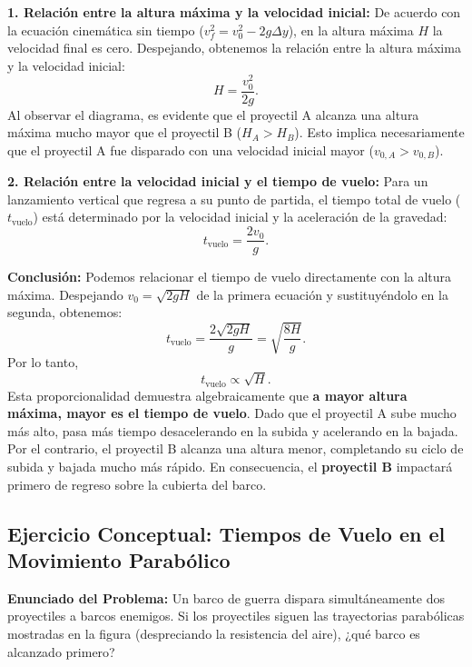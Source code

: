 \documentclass[11pt,a4paper]{book}
\begin{document}
\textbf{1. Relación entre la altura máxima y la velocidad inicial:}
De acuerdo con la ecuación cinemática sin tiempo ($v_f^2 = v_0^2 - 2g\Delta y$), en la altura máxima $H$ la velocidad final es cero. Despejando, obtenemos la relación entre la altura máxima y la velocidad inicial:
\begin{equation}
    H = \frac{v_{0}^2}{2g}.
\end{equation}
Al observar el diagrama, es evidente que el proyectil A alcanza una altura máxima mucho mayor que el proyectil B ($H_A > H_B$). Esto implica necesariamente que el proyectil A fue disparado con una velocidad inicial mayor ($v_{0, A} > v_{0, B}$).

\textbf{2. Relación entre la velocidad inicial y el tiempo de vuelo:}
Para un lanzamiento vertical que regresa a su punto de partida, el tiempo total de vuelo ($t_{\text{vuelo}}$) está determinado por la velocidad inicial y la aceleración de la gravedad:
\begin{equation}
    t_{\text{vuelo}} = \frac{2v_{0}}{g}.
\end{equation}

\textbf{Conclusión:}
Podemos relacionar el tiempo de vuelo directamente con la altura máxima. Despejando $v_0 = \sqrt{2gH}$ de la primera ecuación y sustituyéndolo en la segunda, obtenemos:
\begin{equation}
    t_{\text{vuelo}} = \frac{2\sqrt{2gH}}{g} = \sqrt{\frac{8H}{g}}.
\end{equation}
Por lo tanto,
\begin{equation}
    t_{\text{vuelo}} \propto \sqrt{H}.
\end{equation}
Esta proporcionalidad demuestra algebraicamente que \textbf{a mayor altura máxima, mayor es el tiempo de vuelo}. Dado que el proyectil A sube mucho más alto, pasa más tiempo desacelerando en la subida y acelerando en la bajada. Por el contrario, el proyectil B alcanza una altura menor, completando su ciclo de subida y bajada mucho más rápido. En consecuencia, el \textbf{proyectil B} impactará primero de regreso sobre la cubierta del barco.

\subsection*{Ejercicio Conceptual: Tiempos de Vuelo en el Movimiento Parabólico}

\textbf{Enunciado del Problema:} Un barco de guerra dispara simultáneamente dos proyectiles a barcos enemigos. Si los proyectiles siguen las trayectorias parabólicas mostradas en la figura (despreciando la resistencia del aire), ¿qué barco es alcanzado primero?
\end{document}
